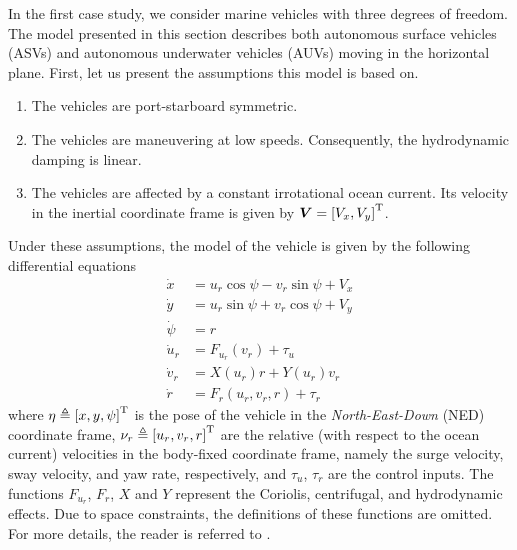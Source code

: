 In the first case study, we consider marine vehicles with three degrees of freedom.
The model presented in this section describes both autonomous surface vehicles (ASVs) and autonomous underwater vehicles (AUVs) moving in the horizontal plane.
First, let us present the assumptions this model is based on.
\begin{enumerate}[label=A\arabic*]
    \item The vehicles are port-starboard symmetric.
    \item The vehicles are maneuvering at low speeds.
    Consequently, the hydrodynamic damping is linear.
    \item The vehicles are affected by a constant irrotational ocean current.
    Its velocity in the inertial coordinate frame is given by $\bm{V} = \left[V_x, V_y\right]^{\mathrm{T}}$.
\end{enumerate}
Under these assumptions, the model of the vehicle is given by the following differential equations \cite{fossen_handbook_2011}
\begin{subequations}\label{eq:ASV-model}
    \begin{align}
        \dot{x} &= u_{r}\cos\psi - v_{r}\sin\psi + V_x\label{eq:ASV-model-a}\\
        \dot{y} &= u_{r}\sin\psi + v_{r}\cos\psi + V_y\label{eq:ASV-model-b}\\
        \dot{\psi} &= r\label{eq:ASV-model-c}\\
        \dot{u}_{r} &= F_{u_r}(v_{r}) + \tau_{u}\label{eq:ASV-model-d}\\ 
        \dot{v}_{r} &= X(u_{r})r + Y(u_{r})v_{r}\label{eq:ASV-model-e}\\ 
        \dot{r} &= F_{r}(u_{r},v_{r},r) + \tau_{r}\label{eq:ASV-model-f}
    \end{align}
\end{subequations}
where $\eta \triangleq \left[x, y, \psi\right]^{\mathrm{T}}$ is the pose of the vehicle in the {\it North-East-Down} (NED) coordinate frame, $\nu_{r} \triangleq \left[u_r, v_r, r\right]^{\mathrm{T}}$ are the relative (with respect to the ocean current) velocities in the body-fixed coordinate frame, namely the surge velocity, sway velocity, and yaw rate, respectively, and $\tau_{u}$, $\tau_{r}$ are the control inputs.
The functions $F_{u_r}$, $F_{r}$, $X$ and $Y$ represent the Coriolis, centrifugal, and hydrodynamic effects.
Due to space constraints, the definitions of these functions are omitted.
For more details, the reader is referred to \cite{fossen_handbook_2011,borhaug_straight_2007}.

